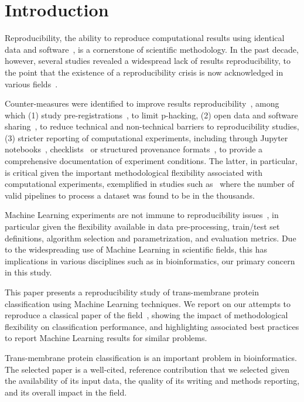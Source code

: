 \section {Introduction}


Reproducibility, the ability to reproduce computational results using
identical data and software~\cite{peng2011reproducible}, is a cornerstone
of scientific methodology. In the past decade, however, several studies
revealed a widespread lack of results reproducibility, to the
point that the existence of a reproducibility crisis is now acknowledged in
various fields~\cite{baker2016reproducibility}.

Counter-measures were identified to improve results
reproducibility~\cite{sandve2013ten}, among which (1) study
pre-registrations~\cite{chambers2015registered}, to limit  p-hacking, (2)
open data and software sharing~\cite{wilkinson2016fair}, to reduce
technical and non-technical barriers to reproducibility studies, (3)
stricter reporting of computational experiments, including through Jupyter
notebooks~\cite{xxx}, checklists~\cite{nichols2017best} or structured
provenance formats~\cite{goble2020fair}, to provide a comprehensive documentation of
experiment conditions. The latter, in particular, is critical given the
important methodological flexibility associated with computational
experiments, exemplified in studies such as~\cite{carp2012plurality} where the number of
valid pipelines to process a dataset was found to be in the thousands.

Machine Learning experiments are not immune to reproducibility
issues~\cite{raff2019step}, in particular given the flexibility available in
data pre-processing, train/test set definitions, algorithm selection and
parametrization, and evaluation metrics. Due to the widespreading use of
Machine Learning in scientific fields, this has implications in various
disciplines such as in bioinformatics, our primary concern in this study.

This paper presents a reproducibility study of trans-membrane protein
classification using Machine Learning techniques. We report on our attempts
to reproduce a classical paper of the field~\cite{mishra2014prediction}, showing the impact
of methodological flexibility on classification performance, and
highlighting associated best practices to report Machine Learning results
for similar problems. 

Trans-membrane protein classification is an important problem in
bioinformatics. The selected paper is a well-cited, reference contribution
that we selected given the availability of its input data, the quality of
its writing and methods reporting, and its overall impact in the field. 
